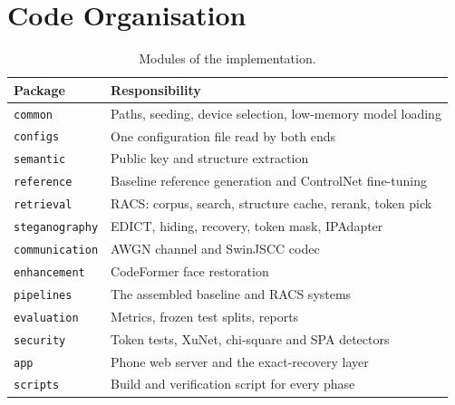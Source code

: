 \section{Code Organisation}
\begin{table}[H]
	\centering
	\caption{Modules of the implementation.}
	\label{tab:modules}
	\begin{tabularx}{\textwidth}{|l|X|}
		\hline
		\textbf{Package} & \textbf{Responsibility} \\ \hline
		\texttt{common} & Paths, seeding, device selection, low-memory model loading \\ \hline
		\texttt{configs} & One configuration file read by both ends \\ \hline
		\texttt{semantic} & Public key and structure extraction \\ \hline
		\texttt{reference} & Baseline reference generation and ControlNet fine-tuning \\ \hline
		\texttt{retrieval} & RACS: corpus, search, structure cache, rerank, token pick \\ \hline
		\texttt{steganography} & EDICT, hiding, recovery, token mask, IPAdapter \\ \hline
		\texttt{communication} & AWGN channel and SwinJSCC codec \\ \hline
		\texttt{enhancement} & CodeFormer face restoration \\ \hline
		\texttt{pipelines} & The assembled baseline and RACS systems \\ \hline
		\texttt{evaluation} & Metrics, frozen test splits, reports \\ \hline
		\texttt{security} & Token tests, XuNet, chi-square and SPA detectors \\ \hline
		\texttt{app} & Phone web server and the exact-recovery layer \\ \hline
		\texttt{scripts} & Build and verification script for every phase \\ \hline
	\end{tabularx}
\end{table}
